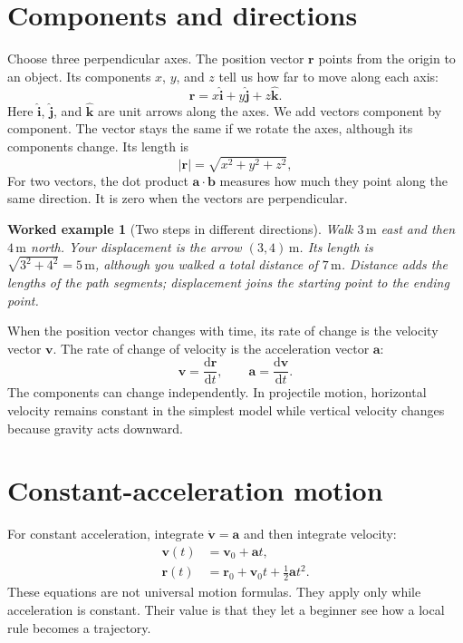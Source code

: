 \documentclass[11pt,oneside]{book}
\newcommand{\dd}{\mathrm{d}}
\newcommand{\vect}[1]{\boldsymbol{#1}}
\newcommand{\od}[2]{\frac{\dd #1}{\dd #2}}
\theoremstyle{reviewstyle}
\newtheorem{example}{Worked example}[chapter]
\begin{document}
\section{Components and directions}
Choose three perpendicular axes. The position vector $\vect r$ points from the origin to an object. Its components $x$, $y$, and $z$ tell us how far to move along each axis:
\begin{equation}
\vect r=x\hat{\vect i}+y\hat{\vect j}+z\hat{\vect k}.
\end{equation}
Here $\hat{\vect i}$, $\hat{\vect j}$, and $\hat{\vect k}$ are unit arrows along the axes. We add vectors component by component. The vector stays the same if we rotate the axes, although its components change. Its length is
\begin{equation}
|\vect r|=\sqrt{x^2+y^2+z^2},
\end{equation}
For two vectors, the dot product $\vect a\cdot\vect b$ measures how much they point along the same direction. It is zero when the vectors are perpendicular.

\begin{example}[Two steps in different directions]
Walk $3\,\mathrm m$ east and then $4\,\mathrm m$ north. Your displacement is the arrow $(3,4)\,\mathrm m$. Its length is $\sqrt{3^2+4^2}=5\,\mathrm m$, although you walked a total distance of $7\,\mathrm m$. Distance adds the lengths of the path segments; displacement joins the starting point to the ending point.
\end{example}

When the position vector changes with time, its rate of change is the velocity vector $\vect v$. The rate of change of velocity is the acceleration vector $\vect a$:
\begin{equation}
\vect v=\od{\vect r}{t},\qquad \vect a=\od{\vect v}{t}.
\end{equation}
The components can change independently. In projectile motion, horizontal velocity remains constant in the simplest model while vertical velocity changes because gravity acts downward.

\section{Constant-acceleration motion}
For constant acceleration, integrate $\dot{\vect v}=\vect a$ and then integrate velocity:
\begin{align}
\vect v(t)&=\vect v_0+\vect at,\\
\vect r(t)&=\vect r_0+\vect v_0t+\tfrac12\vect at^2.
\end{align}
These equations are not universal motion formulas. They apply only while acceleration is constant. Their value is that they let a beginner see how a local rule becomes a trajectory.
\end{document}
